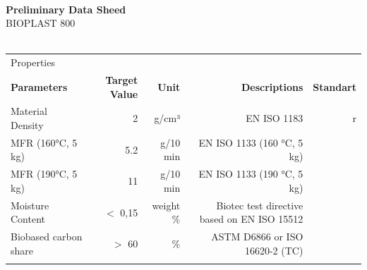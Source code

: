 \documentclass{article}
\begin{document}
\begin{flushleft}
\hspace{1cm}\\
\textbf{Preliminary Data Sheed}\\
BIOPLAST 800\\
\hspace{1cm}\\
\end{flushleft}
\begin{center}
\begin{tabularx}
{\textwidth}{X r  r  r  r }\rowcolor{color_title}Properties &  &  &  &  \\
\textbf{Parameters} & \textbf{Target Value} & \textbf{Unit} & \textbf{Descriptions} & \textbf{Standart} \\
Material Density  & 2 & g/cm³ & EN ISO 1183 & r \\
\arrayrulecolor{line_color}\hline
MFR (160°C, 5 kg) & 5.2 & g/10 min & EN ISO 1133 (160 °C, 5 kg) &  \\
\arrayrulecolor{line_color}\hline
MFR (190°C, 5 kg) & 11 & g/10 min & EN ISO 1133 (190 °C, 5 kg) &  \\
\arrayrulecolor{line_color}\hline
Moisture Content & \(<\) 0,15 & weight \% & Biotec test directive based on EN ISO 15512 &  \\
\arrayrulecolor{line_color}\hline
Biobased carbon share & \(>\) 60 & \% & ASTM D6866 or ISO 16620-2 (TC) &  \\
\arrayrulecolor{line_color}\hline

\end{tabularx}
\end{center}
\end{document}

